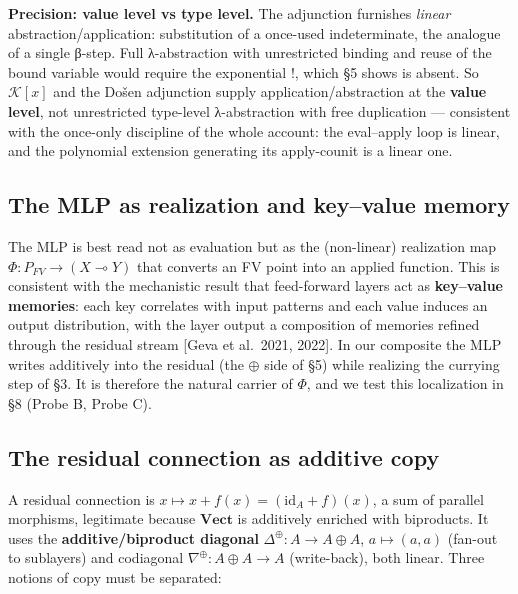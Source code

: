 \documentclass[a4paper,11pt]{article}
\begin{document}
\textbf{Precision: value level vs type level.} The adjunction furnishes
\emph{linear} abstraction/application: substitution of a once-used
indeterminate, the analogue of a single β-step. Full λ-abstraction with
unrestricted binding and reuse of the bound variable would require the
exponential \(!\), which §5 shows is absent. So \(\mathcal{K}[x]\) and
the Došen adjunction supply application/abstraction at the \textbf{value
level}, not unrestricted type-level λ-abstraction with free duplication
--- consistent with the once-only discipline of the whole account: the
eval--apply loop is linear, and the polynomial extension generating its
apply-counit is a linear one.

\hypertarget{the-mlp-as-realization-and-keyvalue-memory}{%
\subsection{The MLP as realization and key--value
memory}\label{the-mlp-as-realization-and-keyvalue-memory}}

The MLP is best read not as evaluation but as the (non-linear)
realization map \(\Phi:P_{FV}\to(X\multimap Y)\) that converts an FV
point into an applied function. This is consistent with the mechanistic
result that feed-forward layers act as \textbf{key--value memories}:
each key correlates with input patterns and each value induces an output
distribution, with the layer output a composition of memories refined
through the residual stream {[}Geva et al.~2021, 2022{]}. In our
composite the MLP writes additively into the residual (the \(\oplus\)
side of §5) while realizing the currying step of §3. It is therefore the
natural carrier of \(\Phi\), and we test this localization in §8 (Probe
B, Probe C).

\hypertarget{the-residual-connection-as-additive-copy}{%
\subsection{The residual connection as additive
copy}\label{the-residual-connection-as-additive-copy}}

A residual connection is \(x\mapsto x+f(x)=(\mathrm{id}_A+f)(x)\), a sum
of parallel morphisms, legitimate because \(\mathbf{Vect}\) is
additively enriched with biproducts. It uses the
\textbf{additive/biproduct diagonal} \(\Delta^{\oplus}:A\to A\oplus A\),
\(a\mapsto(a,a)\) (fan-out to sublayers) and codiagonal
\(\nabla^{\oplus}:A\oplus A\to A\) (write-back), both linear. Three
notions of copy must be separated:
\end{document}
